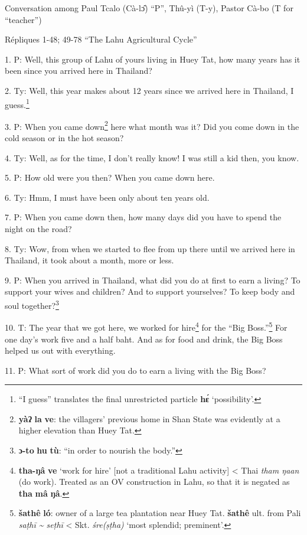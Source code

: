 \setcounter{footnote}{0}

Conversation among Paul Tcalo (Cà-lɔ̂) ``P'', Thû-yì (T-y), Pastor Cà-bo
(T for ``teacher'')

Répliques 1-48; 49-78 ``The Lahu Agricultural Cycle''

1. P: Well, this group of Lahu of yours living in Huey Tat, how many years has
it been since you arrived here in Thailand?

2. Ty: Well, this year makes about 12 years since we arrived here in Thailand,
I guess.\footnote{``I guess'' translates the final unrestricted particle \textbf{hɛ́} `possibility'.}

3. P: When you came down\footnote{\textbf{yàʔ} \textbf{la} \textbf{ve}: the villagers' previous home in Shan State was evidently at a higher elevation than Huey Tat.} here what month was it? Did you come down in the cold
season or in the hot season?

4. Ty: Well, as for the time, I don't really know! I was still a kid then, you
know.

5. P: How old were you then? When you came down here.

6. Ty: Hmm, I must have been only about ten years old.

7. P: When you came down then, how many days did you have to spend the night on
the road?

8. Ty: Wow, from when we started to flee from up there until we arrived here in
Thailand, it took about a month, more or less.

9. P: When you arrived in Thailand, what did you do at first to earn a living?
To support your wives and children? And to support yourselves? To keep body and
soul together?\footnote{\textbf{ɔ-to} \textbf{hu} \textbf{tù}: ``in order to nourish the body.''}

10. T: The year that we got here, we worked for hire\footnote{\textbf{tha-ŋâ} \textbf{ve} `work for hire' [not a traditional Lahu activity] < Thai \textit{tham ŋaan} (do work). Treated as an OV construction in Lahu, so that it is negated as \textbf{tha} \textbf{mâ} \textbf{ŋâ}.} for the ``Big Boss.''\footnote{\textbf{šathê} \textbf{ló}: owner of a large tea plantation near Huey Tat. \textbf{šathê} ult. from Pali \textit{saṭhī \textasciitilde{} seṭhī} < Skt.\textit{ śre(ṣṭha)} `most splendid; preminent'.}
For one day's work five and a half baht. And as for food and drink, the Big Boss
helped us out with everything.

11. P: What sort of work did you do to earn a living with the Big Boss?

